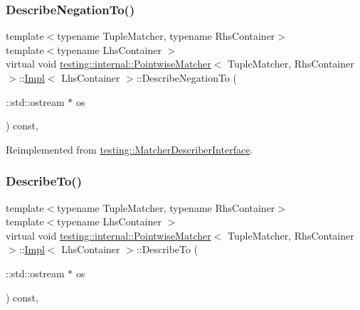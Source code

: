 \subsubsection{\texorpdfstring{Describe\+Negation\+To()}{DescribeNegationTo()}}
{\footnotesize\ttfamily template$<$typename Tuple\+Matcher, typename Rhs\+Container$>$ \\
template$<$typename Lhs\+Container $>$ \\
virtual void \hyperlink{classtesting_1_1internal_1_1_pointwise_matcher}{testing\+::internal\+::\+Pointwise\+Matcher}$<$ Tuple\+Matcher, Rhs\+Container $>$\+::\hyperlink{classtesting_1_1internal_1_1_pointwise_matcher_1_1_impl}{Impl}$<$ Lhs\+Container $>$\+::Describe\+Negation\+To (\begin{DoxyParamCaption}\item[{\+::std\+::ostream $\ast$}]{os }\end{DoxyParamCaption}) const\hspace{0.3cm}{\ttfamily [inline]}, {\ttfamily [virtual]}}



Reimplemented from \hyperlink{classtesting_1_1_matcher_describer_interface_a2071afbc47097c4d1c0064275af34db0}{testing\+::\+Matcher\+Describer\+Interface}.

\mbox{\label{classtesting_1_1internal_1_1_pointwise_matcher_1_1_impl_a0c699f62bbd02595471b793baa9cc75e}} 
\subsubsection{\texorpdfstring{Describe\+To()}{DescribeTo()}}
{\footnotesize\ttfamily template$<$typename Tuple\+Matcher, typename Rhs\+Container$>$ \\
template$<$typename Lhs\+Container $>$ \\
virtual void \hyperlink{classtesting_1_1internal_1_1_pointwise_matcher}{testing\+::internal\+::\+Pointwise\+Matcher}$<$ Tuple\+Matcher, Rhs\+Container $>$\+::\hyperlink{classtesting_1_1internal_1_1_pointwise_matcher_1_1_impl}{Impl}$<$ Lhs\+Container $>$\+::Describe\+To (\begin{DoxyParamCaption}\item[{\+::std\+::ostream $\ast$}]{os }\end{DoxyParamCaption}) const\hspace{0.3cm}{\ttfamily [inline]}, {\ttfamily [virtual]}}



